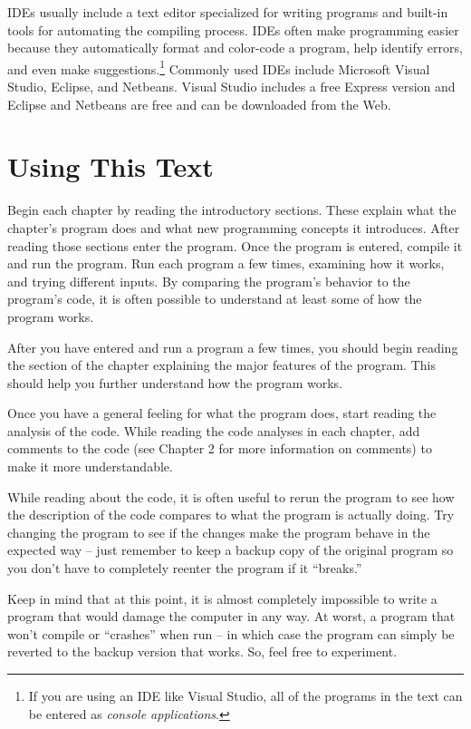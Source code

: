 IDEs usually include a text editor specialized for writing programs and built-in tools for automating the compiling process.  IDEs often make programming easier because they automatically format and color-code a program, help identify errors, and even make suggestions.\footnote{If you are using an IDE like Visual Studio, all of the programs in the text can be entered as \emph{console applications}.}  Commonly used IDEs include Microsoft Visual Studio, Eclipse, and Netbeans.   Visual Studio includes a free Express version and Eclipse and Netbeans are free and can be downloaded from the Web. 


\section{Using This Text}

Begin each chapter by reading the introductory sections.   These explain what the chapter's program does and what new programming concepts it introduces.  After reading those sections enter the program.  Once the program is entered, compile it and run the program.  Run each program a few times, examining how it works, and trying different inputs.  By comparing the program's behavior to the program's code, it is often possible to understand at least some of how the program works.  

After you have entered and run a program a few times, you should begin reading the section of the chapter explaining the major features of the program.  This should help you further understand how the program works.

Once you have a general feeling for what the program does, start reading the analysis of the code.  While reading  the code analyses in each chapter, add comments to the code (see Chapter 2 for more information on comments) to make it more understandable.  

While reading about the code, it is often useful to rerun the program to see how the description of the code compares to what the program is actually doing.  Try changing the program to see if the changes make the program behave in the expected way -- just remember to keep a backup copy of the original program so you don't have to completely reenter the program if it ``breaks.'' 

Keep in mind that at this point, it is almost completely impossible to write a program that would damage the computer in any way.  At worst, a program that won't compile or ``crashes'' when run -- in which case the program can simply be reverted to the backup version that works.  So, feel free to experiment.

